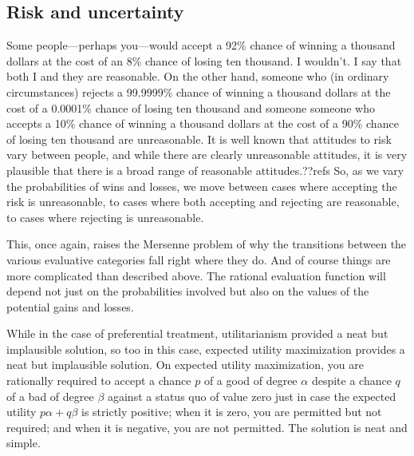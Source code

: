 \subsection{Risk and uncertainty}
Some people---perhaps you---would accept a 92\% chance of winning a thousand dollars at the cost of an 8\% chance
of losing ten thousand. I wouldn't. I say that both I and they are reasonable. On the other hand, someone who 
(in ordinary circumstances) rejects a 99.9999\% chance of winning a thousand dollars at the cost of a 0.0001\% chance
of losing ten thousand and someone someone who accepts a 10\% chance of winning a thousand dollars at the cost of a 90\% chance
of losing ten thousand are unreasonable. 
It is well known that attitudes to risk vary between people, and while there are clearly unreasonable attitudes, it is very plausible
that there is a broad range of reasonable attitudes.??refs
So, as we vary the probabilities of wins and losses, we move between cases
where accepting the risk is unreasonable, to cases where both accepting and rejecting are reasonable, to cases where
rejecting is unreasonable.

This, once again, raises the Mersenne problem of why the transitions between the various evaluative categories fall right where they
do.  And of course things are more complicated than described above. The rational evaluation function will depend not just
on the probabilities involved but also on the values of the potential gains and losses. 

While in the case of preferential treatment, utilitarianism provided a neat but implausible solution, so too in this case, expected utility
maximization provides a neat but implausible solution. On expected utility maximization, you are rationally required to
accept a chance $p$ of a good of degree $\alpha$ despite a chance $q$ of a bad of degree $\beta$ against a status quo of
value zero just in case the
expected utility $p\alpha + q\beta$ is strictly positive; when it is zero, you are permitted but not required; 
and when it is negative, you are not permitted. The solution is neat and simple. 

